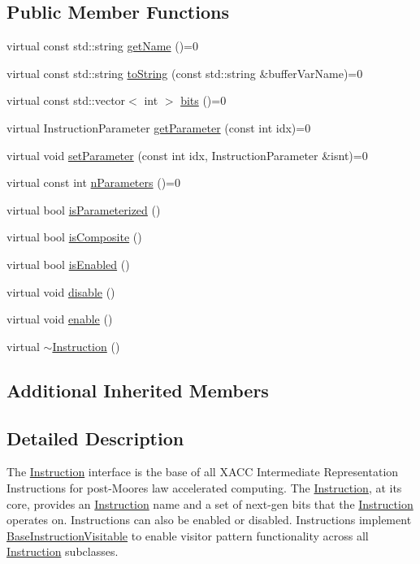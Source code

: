 \subsection*{Public Member Functions}
\begin{DoxyCompactItemize}
\item 
virtual const std\+::string \hyperlink{a00037_ac7ff23f693e2276edbf3fdac5452792c}{get\+Name} ()=0
\item 
virtual const std\+::string \hyperlink{a00037_ae94c2d089908294c1d410b14c96817ae}{to\+String} (const std\+::string \&buffer\+Var\+Name)=0
\item 
virtual const std\+::vector$<$ int $>$ \hyperlink{a00037_a819f32e94c3e1c9e69a0061aaf8d86dc}{bits} ()=0
\item 
virtual Instruction\+Parameter \hyperlink{a00037_aa0d9de97a4833a042379647f83c33ab6}{get\+Parameter} (const int idx)=0
\item 
virtual void \hyperlink{a00037_a407a0ac662fa0b1ec3e301e8ff9bade7}{set\+Parameter} (const int idx, Instruction\+Parameter \&isnt)=0
\item 
virtual const int \hyperlink{a00037_ad54585d13c04ffd20296fff7ab8107ff}{n\+Parameters} ()=0
\item 
virtual bool \hyperlink{a00037_a7b24d8ae485369fc2b2df7a3224a5e26}{is\+Parameterized} ()
\item 
virtual bool \hyperlink{a00037_a4383f1036d0fcfe890ab9c613dbd5f38}{is\+Composite} ()
\item 
virtual bool \hyperlink{a00037_ad02a1cf7220577124720b7a51424cea7}{is\+Enabled} ()
\item 
virtual void \hyperlink{a00037_a6e528da15e05a94cc1d7db268c483271}{disable} ()
\item 
virtual void \hyperlink{a00037_a0b4f2e5a591af28342a3c08e4305e24f}{enable} ()
\item 
virtual \hyperlink{a00037_ae22c935e8113bce63d1d0e214cda4d61}{$\sim$\+Instruction} ()
\end{DoxyCompactItemize}
\subsection*{Additional Inherited Members}


\subsection{Detailed Description}
The \hyperlink{a00037}{Instruction} interface is the base of all X\+A\+CC Intermediate Representation Instructions for post-\/\+Moore\textquotesingle{}s law accelerated computing. The \hyperlink{a00037}{Instruction}, at its core, provides an \hyperlink{a00037}{Instruction} name and a set of next-\/gen bits that the \hyperlink{a00037}{Instruction} operates on. Instructions can also be enabled or disabled. Instructions implement \hyperlink{a00015}{Base\+Instruction\+Visitable} to enable visitor pattern functionality across all \hyperlink{a00037}{Instruction} subclasses.

